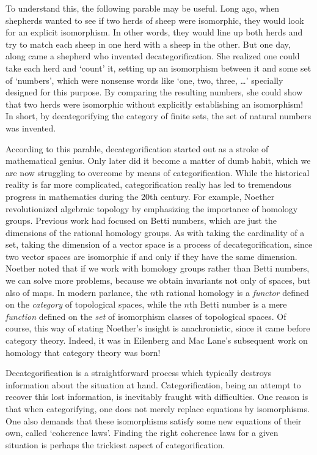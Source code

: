 To understand this, the following parable may be useful.  Long ago, when
shepherds wanted to see if two herds of sheep were isomorphic, they
would look for an explicit isomorphism.  In other words, they would line
up both herds and try to match each sheep in one herd with a sheep in
the other.  But one day, along came a shepherd who invented
decategorification.  She realized one could take each herd and `count'
it, setting up an isomorphism between it and some set of `numbers',
which were nonsense words like `one, two, three, \dots' specially
designed for this purpose.  By comparing the resulting numbers, she
could show that two herds were isomorphic without explicitly
establishing an isomorphism!  In short, by decategorifying the category
of finite sets, the set of natural numbers was invented.   

According to this parable, decategorification started out as a stroke of
mathematical genius.  Only later did it become a matter of dumb habit,
which we are now struggling to overcome by means of categorification.
While the historical reality is far more complicated, categorification
really has led to tremendous progress in mathematics during the 20th
century.  For example, Noether revolutionized algebraic topology by
emphasizing the importance of homology groups.  Previous work had
focused on Betti numbers, which are just the dimensions of the rational
homology groups.  As with taking the cardinality of a set, taking the
dimension of a vector space is a process of decategorification, since
two vector spaces are isomorphic if and only if they have the same
dimension.  Noether noted that if we work with homology groups rather
than Betti numbers, we can solve more problems, because we obtain
invariants not only of spaces, but also of maps.  In modern parlance,
the $n$th rational homology is a {\it functor} defined on the {\it
category} of topological spaces, while the $n$th Betti number is a mere
{\it function} defined on the {\it set} of isomorphism classes of
topological spaces.  Of course, this way of stating Noether's insight is
anachronistic, since it came before category theory.  Indeed, it was in
Eilenberg and Mac Lane's subsequent work on homology that category
theory was born!

Decategorification is a straightforward process which typically 
destroys information about the situation at hand.  Categorification,
being an attempt to recover this lost information, is inevitably fraught
with difficulties.  One reason is that when categorifying, one does not
merely replace equations by isomorphisms.  One also demands that these
isomorphisms satisfy some new equations of their own, called `coherence
laws'.  Finding the right coherence laws for a given situation is
perhaps the trickiest aspect of categorification.

